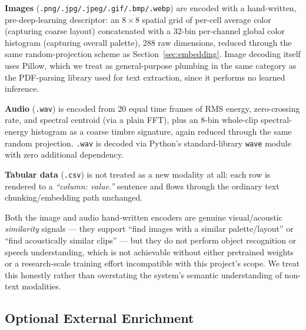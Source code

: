 \documentclass[conference]{IEEEtran}
\begin{document}
\textbf{Images} (\texttt{.png/.jpg/.jpeg/.gif/.bmp/.webp}) are encoded with a hand-written,
pre-deep-learning descriptor: an $8\times8$ spatial grid of per-cell average color
(capturing coarse layout) concatenated with a 32-bin per-channel global color histogram
(capturing overall palette), 288 raw dimensions, reduced through the same random-projection
scheme as Section~\ref{sec:embedding}. Image decoding itself uses Pillow, which we treat as
general-purpose plumbing in the same category as the PDF-parsing library used for text
extraction, since it performs no learned inference.

\textbf{Audio} (\texttt{.wav}) is encoded from 20 equal time frames of RMS energy,
zero-crossing rate, and spectral centroid (via a plain FFT), plus an 8-bin whole-clip
spectral-energy histogram as a coarse timbre signature, again reduced through the same
random projection. \texttt{.wav} is decoded via Python's standard-library \texttt{wave}
module with zero additional dependency.

\textbf{Tabular data} (\texttt{.csv}) is not treated as a new modality at all: each row is
rendered to a \emph{``column: value.''} sentence and flows through the ordinary text
chunking/embedding path unchanged.

Both the image and audio hand-written encoders are genuine visual/acoustic
\emph{similarity} signals --- they support ``find images with a similar palette/layout'' or
``find acoustically similar clips'' --- but they do not perform object recognition or speech
understanding, which is not achievable without either pretrained weights or a
research-scale training effort incompatible with this project's scope. We treat this
honestly rather than overstating the system's semantic understanding of non-text modalities.

\subsection{Optional External Enrichment}
\end{document}
